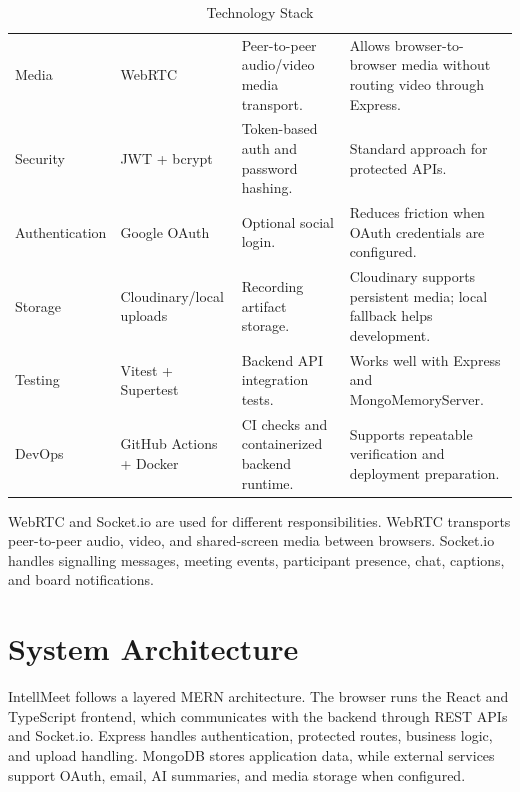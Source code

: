 \documentclass[11pt,a4paper]{article}
\begin{document}
\begin{table}[H]
\begin{tabularx}{\linewidth}{L{2.5cm} L{3.0cm} Y Y}
Media & WebRTC & Peer-to-peer audio/video media transport. & Allows browser-to-browser media without routing video through Express.\\
Security & JWT + bcrypt & Token-based auth and password hashing. & Standard approach for protected APIs.\\
Authentication & Google OAuth & Optional social login. & Reduces friction when OAuth credentials are configured.\\
Storage & Cloudinary/local uploads & Recording artifact storage. & Cloudinary supports persistent media; local fallback helps development.\\
Testing & Vitest + Supertest & Backend API integration tests. & Works well with Express and MongoMemoryServer.\\
DevOps & GitHub Actions + Docker & CI checks and containerized backend runtime. & Supports repeatable verification and deployment preparation.\\
\bottomrule
\end{tabularx}
\caption{Technology Stack}
\label{tab:stack}
\end{table}

WebRTC and Socket.io are used for different responsibilities. WebRTC transports peer-to-peer audio, video, and shared-screen media between browsers. Socket.io handles signalling messages, meeting events, participant presence, chat, captions, and board notifications.

\newpage

\section{System Architecture}
IntellMeet follows a layered MERN architecture. The browser runs the React and TypeScript frontend, which communicates with the backend through REST APIs and Socket.io. Express handles authentication, protected routes, business logic, and upload handling. MongoDB stores application data, while external services support OAuth, email, AI summaries, and media storage when configured.
\end{document}
